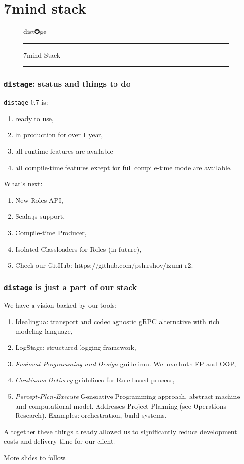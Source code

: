 \documentclass[usenames,dvipsnames]{beamer}
\newcommand{\distage}{\texttt{distage}\xspace}
\begin{document}
\section{7mind stack}
\begin{frame}
  \begin{figure}
  \Huge
  \color{RubineRed} dist✪ge
  \noindent
  \rule{\linewidth}{1mm}
  \Large 7mind Stack
  \rule{\linewidth}{1mm}
  \end{figure}
\end{frame}

\begin{frame}[fragile]
  \frametitle{\distage: status and things to do}
  \distage{} 0.7 is:
  \begin{enumerate}
    \item ready to use,
    \item in production for over 1 year,
    \item all runtime features are available,
    \item all compile-time features except for full compile-time mode are available.
  \end{enumerate}
  \vspace{0.3cm}
  What's next:
  \begin{enumerate}
    \item New Roles API,
    \item Scala.js support,
    \item Compile-time Producer,
    \item Isolated Classloaders for Roles (in future),
    \item Check our GitHub: https://github.com/pshirshov/izumi-r2.
  \end{enumerate}
\end{frame}

\begin{frame}
  \frametitle{\distage is just a part of our stack}
  We have a vision backed by our tools:
  \begin{enumerate}
    \item Idealingua: transport and codec agnostic gRPC alternative with rich modeling language,
    \item LogStage: structured logging framework,
    \item \textit{Fusional Programming and Design} guidelines. We love both FP and OOP,
    \item \textit{Continous Delivery} guidelines for Role-based process,
    \item \textit{Percept-Plan-Execute} Generative Programming approach, abstract machine and computational model.
    Addresses Project Planning (see Operations Research). Examples: orchestration, build systems.
  \end{enumerate}

  Altogether these things already allowed us to significantly reduce development costs and
  delivery time for our client.\newline

  More slides to follow.
\end{frame}
\end{document}
